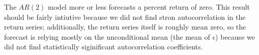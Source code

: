 \documentclass[]{book}
\theoremstyle{definition}
\theoremstyle{definition}
\theoremstyle{remark}
\begin{document}
The \(AR(2)\) model more or less forecasts a percent return of zero.
This result should be fairly intiutive because we did not find stron
autocorrelation in the return series; additionally, the return series
itself is roughly mean zero, so the forecast is relying mostly on the
unconditional mean (the mean of \(\epsilon\)) because we did not find
statistically siginificant autocorrelation coefficients.


\end{document}
